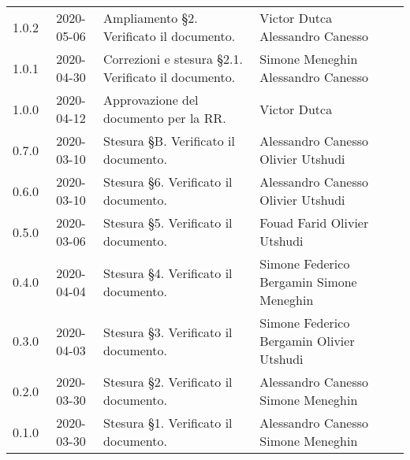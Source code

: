 {\begin{longtable}{ c c  C{4cm}  C{4cm}  C{3cm} }
		1.0.2 & 2020-05-06 & Ampliamento \S 2. Verificato il documento. & Victor Dutca \newline Alessandro Canesso &\Res{} \newline \ver{}\\
		1.0.1 & 2020-04-30 & Correzioni e stesura \S 2.1. Verificato il documento. & Simone Meneghin \newline Alessandro Canesso &\Res{} \newline \ver{}\\
		1.0.0 & 2020-04-12 & Approvazione del documento per la RR. & Victor Dutca &\RdP{} \\
		0.7.0 & 2020-03-10 & Stesura \S B. Verificato il documento. & Alessandro Canesso \newline Olivier Utshudi &\Res{} \newline \ver{}\\
		0.6.0 & 2020-03-10 & Stesura \S 6. Verificato il documento. & Alessandro Canesso \newline Olivier Utshudi &\Res{} \newline \ver{}\\
		0.5.0 & 2020-03-06 & Stesura \S 5. Verificato il documento.  & Fouad Farid \newline Olivier Utshudi &\Res{} \newline \ver{}\\
		0.4.0 & 2020-04-04 & Stesura \S 4. Verificato il documento. & Simone Federico Bergamin \newline Simone Meneghin &\adm{} \newline \ver{}\\	
		0.3.0 & 2020-04-03 & Stesura \S 3. Verificato il documento.  & Simone Federico Bergamin \newline Olivier Utshudi &\adm{} \newline \ver{}\\	
		0.2.0 & 2020-03-30 & Stesura \S 2. Verificato il documento.  & Alessandro Canesso \newline Simone Meneghin &\Res{} \newline \ver{}\\	
		0.1.0 & 2020-03-30 & Stesura \S 1. Verificato il documento. & Alessandro Canesso \newline Simone Meneghin &\Res{} \newline \ver{}\\		
	\end{longtable}
} 
